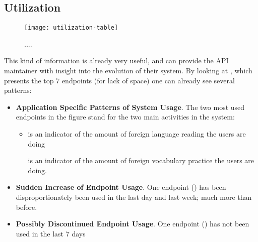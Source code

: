 

\newpage
\subsection{Utilization}
\label{sec:util}




  \begin{figure}[h!]
  \centering
  \texttt{[image: utilization-table]}
  \caption{....}
  \label{fig:basicest}
  \end{figure}

This kind of information is already very useful, and can provide the API maintainer with insight into the evolution of their system. By looking at , which presents the top 7 endpoints (for lack of space) one can already see several patterns: 

\begin{itemize}

  \item {\bf Application Specific Patterns of System Usage}. The two most used endpoints in the figure stand for the two main activities in the system: 

  \begin{itemize}

    \item \epTranslations is an indicator of the amount of foreign language reading the users are doing

    \epOutcome is an indicator of the amount of foreign vocabulary practice the users are doing.

  \end{itemize}

  \item {\bf Sudden Increase of Endpoint Usage}. One endpoint (\epUserActivity) has been disproportionately been used in the last day and last week; much more than before. 

  \item {\bf Possibly Discontinued Endpoint Usage}. One endpoint (\epFeedItems) has not been used in the last 7 days

\end{itemize}

